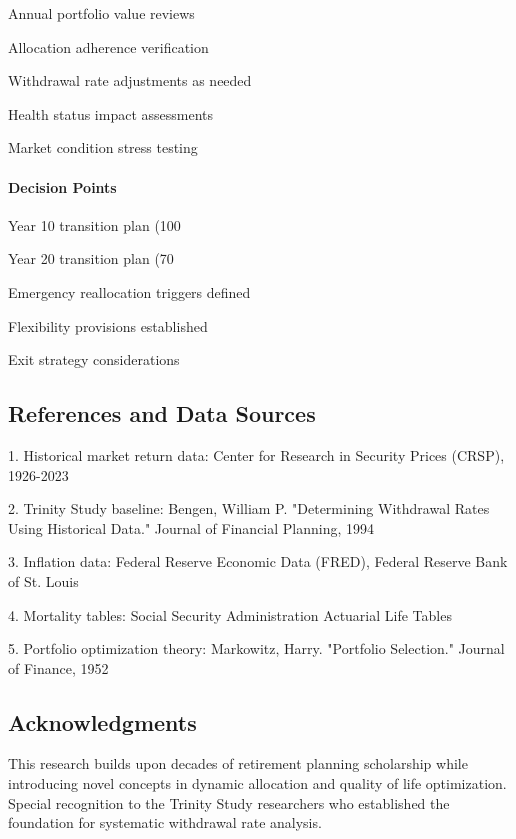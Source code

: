\documentclass[11pt,letterpaper]{article}
\begin{document}
{{{{{{{{{{{\item [ ] Annual portfolio value reviews
\item [ ] Allocation adherence verification
\item [ ] Withdrawal rate adjustments as needed
\item [ ] Health status impact assessments
\item [ ] Market condition stress testing

\paragraph{Decision Points}

\item [ ] Year 10 transition plan (100%
\item [ ] Year 20 transition plan (70%
\item [ ] Emergency reallocation triggers defined
\item [ ] Flexibility provisions established
\item [ ] Exit strategy considerations



\subsection{References and Data Sources}


1. Historical market return data: Center for Research in Security Prices (CRSP), 1926-2023

2. Trinity Study baseline: Bengen, William P. "Determining Withdrawal Rates Using Historical Data." Journal of Financial Planning, 1994

3. Inflation data: Federal Reserve Economic Data (FRED), Federal Reserve Bank of St. Louis

4. Mortality tables: Social Security Administration Actuarial Life Tables

5. Portfolio optimization theory: Markowitz, Harry. "Portfolio Selection." Journal of Finance, 1952


\subsection{Acknowledgments}


This research builds upon decades of retirement planning scholarship while introducing novel concepts in dynamic allocation and quality of life optimization. Special recognition to the Trinity Study researchers who established the foundation for systematic withdrawal rate analysis.


}}}}}}}}}}}
\end{document}
